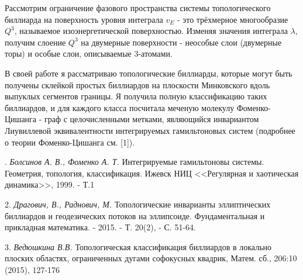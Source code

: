 Рассмотрим ограничение фазового пространства системы топологического биллиарда на поверхность уровня интеграла $v_E$ - это трёхмерное многообразие $Q^3$, называемое изоэнергетической поверхностью. Изменяя значения интеграла $\lambda$, получим слоение $Q^3$ на двумерные поверхности - неособые слои (двумерные торы) и особые слои, описываемые 3-атомами.

В своей работе я рассматриваю топологические биллиарды, которые могут быть получены склейкой простых биллиардов на плоскости Минковского вдоль выпуклых сегментов границы. Я получила полную классификацию таких биллиардов, и для каждого класса посчитала меченую молекулу Фоменко-Цишанга - граф с целочисленными метками, являющийся инвариантом Лиувиллевой эквивалентности интегрируемых гамильтоновых систем (подробнее о теории Фоменко-Цишанга см. [1]).





. {\it Болсинов А. В., Фоменко А. Т.} Интегрируемые гамильтоновы системы. Геометрия, топология, классификация. Ижевск НИЦ <<Регулярная и хаотическая динамика>>, 1999. - Т.1


2. {\it Драгович, В., Раднович, М.} Топологические инварианты эллиптических биллиардов и геодезических потоков на эллипсоиде. Фундаментальная и прикладная математика. - 2015. - Т. 20(2), - С. 51-64.

3. {\it Ведюшкина В.В.} Топологическая классификация биллиардов в локально плоских областях,
ограниченных дугами софокусных квадрик, Матем. сб., 206:10 (2015), 127-176
